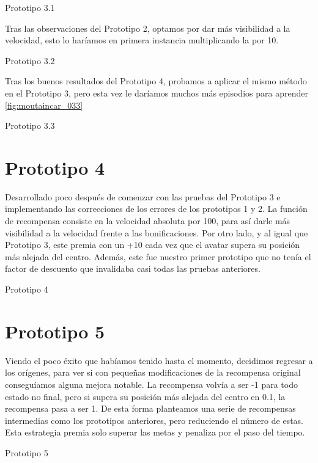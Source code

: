 %
{Prototipo 3.1}

Tras las observaciones del Prototipo 2, optamos por dar más visibilidad a la velocidad, esto lo haríamos en primera instancia multiplicando la por 10.

%
{Prototipo 3.2}

Tras los buenos resultados del Prototipo 4, probamos a aplicar el mismo método en el Prototipo 3, pero esta vez le daríamos muchos más episodios para aprender \ref{fig:moutaincar_033}

%
{Prototipo 3.3}

\section{Prototipo 4}
Desarrollado poco después de comenzar con las pruebas del Prototipo 3 e implementando las correcciones de los errores de los prototipos 1 y 2.
La función de recompensa consiste en la velocidad absoluta por 100, para así darle más visibilidad a la velocidad frente a las bonificaciones. Por otro lado, y al igual que Prototipo 3, este premia con un +10 cada vez que el avatar supera su posición más alejada del centro. Además, este fue nuestro primer prototipo que no tenía el factor de descuento que invalidaba casi todas las pruebas anteriores.

%
{Prototipo 4}

\section{Prototipo 5}
Viendo el poco éxito que habíamos tenido hasta el momento, decidimos regresar a los orígenes, para ver si con pequeñas modificaciones de la recompensa original conseguíamos alguna mejora notable.
La recompensa volvía a ser -1 para todo estado no final, pero si supera su posición más alejada del centro en 0.1, la recompensa pasa a ser 1. De esta forma planteamos una serie de recompensas intermedias como los prototipos anteriores, pero reduciendo el número de estas. Esta estrategia premia solo superar las metas y penaliza por el paso del tiempo.

%
{Prototipo 5}


